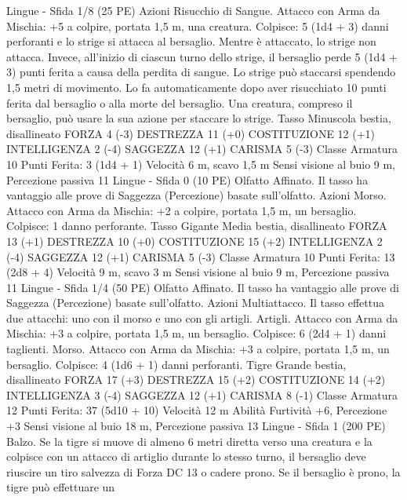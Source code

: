 \begin{multicols}{2}
Lingue -
Sfida 1/8 (25 PE)
Azioni
Risucchio di Sangue. Attacco con Arma da Mischia: +5 a
colpire, portata 1,5 m, una creatura.
Colpisce: 5 (1d4 + 3) danni perforanti e lo strige si attacca al
bersaglio. Mentre è attaccato, lo strige non attacca. Invece,
all’inizio di ciascun turno dello strige, il bersaglio perde 5 (1d4 +
3) punti ferita a causa della perdita di sangue.
Lo strige può staccarsi spendendo 1,5 metri di movimento. Lo fa
automaticamente dopo aver risucchiato 10 punti ferita dal
bersaglio o alla morte del bersaglio. Una creatura, compreso il
bersaglio, può usare la sua azione per staccare lo strige.
Tasso
Minuscola bestia, disallineato
FORZA 4 (-3)
DESTREZZA 11 (+0)
COSTITUZIONE 12 (+1)
INTELLIGENZA 2 (-4)
SAGGEZZA 12 (+1)
CARISMA 5 (-3)
Classe Armatura 10
\hspace*{0pt}\hfill{Punti Ferita}: 3 (1d4 + 1)
Velocità 6 m, scavo 1,5 m
Sensi visione al buio 9 m, Percezione passiva 11
Lingue -
Sfida 0 (10 PE)
Olfatto Affinato. Il tasso ha vantaggio alle prove di Saggezza
(Percezione) basate sull’olfatto.
Azioni
Morso. Attacco con Arma da Mischia: +2 a colpire, portata 1,5
m, un bersaglio.
Colpisce: 1 danno perforante.
Tasso Gigante
Media bestia, disallineato
FORZA 13 (+1)
DESTREZZA 10 (+0)
COSTITUZIONE 15 (+2)
INTELLIGENZA 2 (-4)
SAGGEZZA 12 (+1)
CARISMA 5 (-3)
Classe Armatura 10
\hspace*{0pt}\hfill{Punti Ferita}: 13 (2d8 + 4)
Velocità 9 m, scavo 3 m
Sensi visione al buio 9 m, Percezione passiva 11
Lingue -
Sfida 1/4 (50 PE)
Olfatto Affinato. Il tasso ha vantaggio alle prove di Saggezza
(Percezione) basate sull’olfatto.
Azioni
Multiattacco. Il tasso effettua due attacchi: uno con il morso e
uno con gli artigli.
Artigli. Attacco con Arma da Mischia: +3 a colpire, portata 1,5
m, un bersaglio.
Colpisce: 6 (2d4 + 1) danni taglienti.
Morso. Attacco con Arma da Mischia: +3 a colpire, portata 1,5
m, un bersaglio.
Colpisce: 4 (1d6 + 1) danni perforanti.
Tigre
Grande bestia, disallineato
FORZA 17 (+3)
DESTREZZA 15 (+2)
COSTITUZIONE 14 (+2)
INTELLIGENZA 3 (-4)
SAGGEZZA 12 (+1)
CARISMA 8 (-1)
Classe Armatura 12
\hspace*{0pt}\hfill{Punti Ferita}: 37 (5d10 + 10)
Velocità 12 m
Abilità Furtività +6, Percezione +3
Sensi visione al buio 18 m, Percezione passiva 13
Lingue -
Sfida 1 (200 PE)
Balzo. Se la tigre si muove di almeno 6 metri diretta verso una
creatura e la colpisce con un attacco di artiglio durante lo stesso
turno, il bersaglio deve riuscire un tiro salvezza di Forza DC 13 o
cadere prono. Se il bersaglio è prono, la tigre può effettuare un

\end{multicols}
